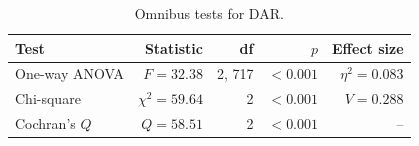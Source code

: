 \begin{table}[H]
\caption{Omnibus tests for DAR.}
\label{tab:da:omnibus}
\centering
\begin{tabular}{lrrrr}
\toprule
Test & Statistic & df & $p$ & Effect size \\
\midrule
One-way ANOVA & $F = 32.38$ & 2, 717 & $<0.001$ & $\eta^2 = 0.083$ \\
Chi-square & $\chi^2 = 59.64$ & 2 & $<0.001$ & $V = 0.288$ \\
Cochran's $Q$ & $Q = 58.51$ & 2 & $<0.001$ & -- \\
\bottomrule
\end{tabular}
\end{table}
